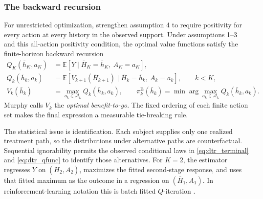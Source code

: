 \subsubsection*{The backward recursion}

For unrestricted optimization, strengthen assumption 4 to require positivity for every action at every history in the observed support. Under assumptions 1--3 and this all-action positivity condition, the optimal value functions satisfy the finite-horizon backward recursion
\begin{align}
Q_K(\bar h_K, a_K) &= \mathbb{E}\!\left[Y \mid \bar H_K = \bar h_K,\ A_K = a_K\right], \label{eq:dtr_terminal}\\
Q_k(\bar h_k, a_k) &= \mathbb{E}\!\left[V_{k+1}(\bar H_{k+1}) \mid \bar H_k = \bar h_k,\ A_k = a_k\right], \qquad k<K, \label{eq:dtr_qfunc}\\
V_k(\bar h_k) &= \max_{a_k \in \mathcal A_k} Q_k(\bar h_k, a_k), \qquad
\pi_k^{\mathrm B}(\bar h_k) = \min\arg\max_{a_k \in \mathcal A_k} Q_k(\bar h_k, a_k). \label{eq:dtr_bellman}
\end{align}
Murphy calls $V_k$ the \emph{optimal benefit-to-go}. The fixed ordering of each finite action set makes the final expression a measurable tie-breaking rule.

The statistical issue is identification. Each subject supplies only one realized treatment path, so the distributions under alternative paths are counterfactual. Sequential ignorability permits the observed conditional laws in \eqref{eq:dtr_terminal} and \eqref{eq:dtr_qfunc} to identify those alternatives. For $K=2$, the estimator regresses $Y$ on $(\bar H_2,A_2)$, maximizes the fitted second-stage response, and uses that fitted maximum as the outcome in a regression on $(\bar H_1,A_1)$. In reinforcement-learning notation this is batch fitted $Q$-iteration \citep{schulte2014qlearning}.

